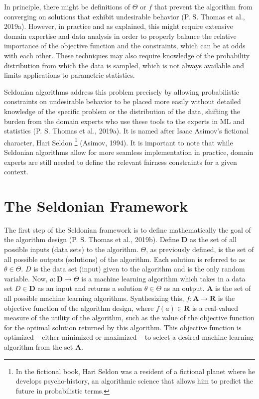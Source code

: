 \documentclass[12pt, twoside]{amherstthesis}
\begin{document}
In principle, there might be definitions of \(\Theta\) or \(f\) that prevent the algorithm from converging on solutions that exhibit undesirable behavior (P. S. Thomas et al., 2019a). However, in practice and as explained, this might require extensive domain expertise and data analysis in order to properly balance the relative importance of the objective function and the constraints, which can be at odds with each other. These techniques may also require knowledge of the probability distribution from which the data is sampled, which is not always available and limits applications to parametric statistics.

Seldonian algorithms address this problem precisely by allowing probabilistic constraints on undesirable behavior to be placed more easily without detailed knowledge of the specific problem or the distribution of the data, shifting the burden from the domain experts who use these tools to the experts in ML and statistics (P. S. Thomas et al., 2019a). It is named after Isaac Asimov's fictional character, Hari Seldon \footnote{In the fictional book, Hari Seldon was a resident of a fictional planet where he develops psycho-history, an algorithmic science that allows him to predict the future in probabilistic terms.} (Asimov, 1994). It is important to note that while Seldonian algorithms allow for more seamless implementation in practice, domain experts are still needed to define the relevant fairness constraints for a given context.

\hypertarget{seldonian}{%
\section{The Seldonian Framework}\label{seldonian}}

The first step of the Seldonian framework is to define mathematically the goal of the algorithm design (P. S. Thomas et al., 2019b). Define \(\textbf{D}\) as the set of all possible inputs (data sets) to the algorithm. \(\Theta\), as previously defined, is the set of all possible outputs (solutions) of the algorithm. Each solution is referred to as \(\theta \in \Theta\). \(D\) is the data set (input) given to the algorithm and is the only random variable. Now, \(a: \textbf{D} \rightarrow \Theta\) is a machine learning algorithm which takes in a data set \(D \in \textbf{D}\) as an input and returns a solution \(\theta \in \Theta\) as an output. \(\textbf{A}\) is the set of all possible machine learning algorithms. Synthesizing this, \(f: \textbf{A} \rightarrow \textbf{R}\) is the objective function of the algorithm design, where \(f(a) \in \textbf{R}\) is a real-valued measure of the utility of the algorithm, such as the value of the objective function for the optimal solution returned by this algorithm. This objective function is optimized -- either minimized or maximized -- to select a desired machine learning algorithm from the set \(\textbf{A}\).
\end{document}
